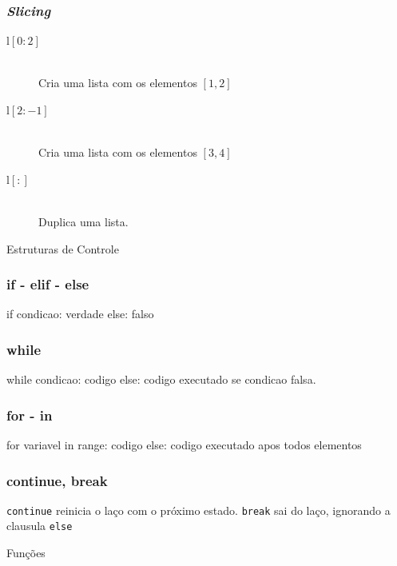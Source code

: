\documentclass[aspectratio=169,14pt]{beamer}
\begin{document}
\begin{frame}
    \frametitle{\textit{Slicing}}
    \begin{description}
        \item[l{$[0:2]$}] \hfill \\ Cria uma lista com os elementos $[1,2]$
        \item[l{$[2:-1]$}] \hfill \\ Cria uma lista com os elementos $[3,4]$
        \item[l{$[:]$}] \hfill \\ Duplica uma lista.
    \end{description}
\end{frame}

\begin{frame}
    \begin{center}
        \Huge Estruturas de Controle
    \end{center}
\end{frame}

\begin{frame}[fragile]
    \frametitle{if - elif - else}
    \begin{python}
        if condicao:
            verdade
        else:
            falso
    \end{python}
\end{frame}

\begin{frame}[fragile]
    \frametitle{while}
    \begin{python}
        while condicao:
            codigo
        else:
            codigo executado se condicao falsa.
    \end{python}
\end{frame}

\begin{frame}[fragile]
    \frametitle{for - in}
    \begin{python}
        for variavel in range:
            codigo
        else:
            codigo executado apos todos elementos
    \end{python}
\end{frame}

\begin{frame}
    \frametitle{continue, break}
    \texttt{\color{green}continue} reinicia o laço com o próximo estado.
    \texttt{\color{green}break} sai do laço, ignorando a clausula
    \texttt{\color{green}else}
\end{frame}

\begin{frame}
    \begin{center}
        \Huge Funções
    \end{center}
\end{frame}
\end{document}
